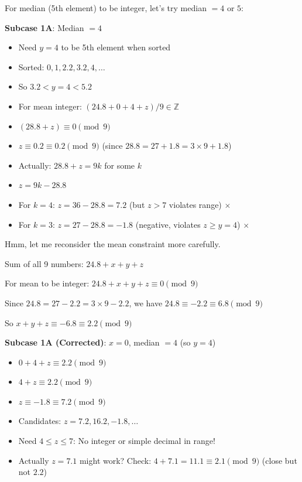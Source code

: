 \documentclass[11pt]{article}
\begin{document}
\begin{solutionbox}
For median (5th element) to be integer, let's try median $= 4$ or $5$:

\textbf{Subcase 1A}: Median $= 4$
\begin{itemize}
    \item Need $y = 4$ to be 5th element when sorted
    \item Sorted: $0, 1, 2.2, 3.2, 4, \ldots$
    \item So $3.2 < y = 4 < 5.2$ \checkmark
    \item For mean integer: $(24.8 + 0 + 4 + z)/9 \in \mathbb{Z}$
    \item $(28.8 + z) \equiv 0 \pmod{9}$
    \item $z \equiv 0.2 \equiv 0.2 \pmod{9}$ (since $28.8 = 27 + 1.8 = 3 \times 9 + 1.8$)
    \item Actually: $28.8 + z = 9k$ for some $k$
    \item $z = 9k - 28.8$
    \item For $k = 4$: $z = 36 - 28.8 = 7.2$ (but $z > 7$ violates range) $\times$
    \item For $k = 3$: $z = 27 - 28.8 = -1.8$ (negative, violates $z \geq y = 4$) $\times$
\end{itemize}

Hmm, let me reconsider the mean constraint more carefully.

Sum of all 9 numbers: $24.8 + x + y + z$

For mean to be integer: $24.8 + x + y + z \equiv 0 \pmod{9}$

Since $24.8 = 27 - 2.2 = 3 \times 9 - 2.2$, we have $24.8 \equiv -2.2 \equiv 6.8 \pmod{9}$

So $x + y + z \equiv -6.8 \equiv 2.2 \pmod{9}$

\textbf{Subcase 1A (Corrected)}: $x = 0$, median $= 4$ (so $y = 4$)
\begin{itemize}
    \item $0 + 4 + z \equiv 2.2 \pmod{9}$
    \item $4 + z \equiv 2.2 \pmod{9}$
    \item $z \equiv -1.8 \equiv 7.2 \pmod{9}$
    \item Candidates: $z = 7.2, 16.2, -1.8, \ldots$
    \item Need $4 \leq z \leq 7$: No integer or simple decimal in range!
    \item Actually $z = 7.1$ might work? Check: $4 + 7.1 = 11.1 \equiv 2.1 \pmod{9}$ (close but not $2.2$)
\end{itemize}


\end{solutionbox}
\end{document}
